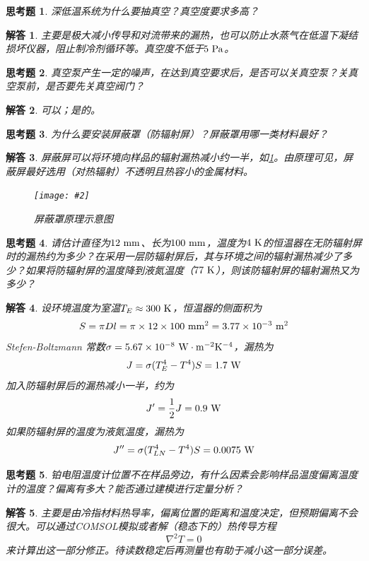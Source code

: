 \documentclass[11pt,a4paper]{ctexart}
\newcommand{\cpic}[2]{
\begin{center}
\texttt{[image: \#2]}
\end{center}
}
\newcommand{\cpicn}[3]
{
\begin{figure}[H]
\cpic{#1}{#2}
\caption{#3\label{#2}}
\end{figure}
}
\newcommand{\beq}{\begin{equation}}
\newcommand{\eeq}{\end{equation}}
\newcommand{\unit}[1]{\rm \ #1}
\newtheorem{que}{思考题}[section]
\newtheorem{ans}{解答}[section]
\begin{document}
\begin{que}
深低温系统为什么要抽真空？真空度要求多高？
\end{que}
\begin{ans}
主要是极大减小传导和对流带来的漏热，也可以防止水蒸气在低温下凝结损坏仪器，阻止制冷剂循环等。真空度不低于$5\unit{Pa}$。
\end{ans}
\begin{que}
真空泵产生一定的噪声，在达到真空要求后，是否可以关真空泵？关真空泵前，是否要先关真空阀门？
\end{que}
\begin{ans}
可以；是的。
\end{ans}
\begin{que}
为什么要安装屏蔽罩（防辐射屏）？屏蔽罩用哪一类材料最好？
\end{que}
\begin{ans}
屏蔽屏可以将环境向样品的辐射漏热减小约一半，如\cref{rad_red}。由原理可见，屏蔽屏最好选用（对热辐射）不透明且热容小的金属材料。
\cpicn{0.1}{rad_red}{屏蔽罩原理示意图}
\end{ans}
\begin{que}
请估计直径为$12\unit{mm}$、长为$100\unit{mm}$，温度为$4\unit{K}$的恒温器在无防辐射屏时的漏热约为多少？在采用一层防辐射屏后，其与环境之间的辐射漏热减少了多少？如果将防辐射屏的温度降到液氮温度（$77\unit{K}$），则该防辐射屏的辐射漏热又为多少？
\end{que}
\begin{ans}
设环境温度为室温$T_E \approx 300\unit{K}$，恒温器的侧面积为
\beq
S = \pi D l = \pi \times 12 \times 100 \unit{mm^2} = 3.77\times 10^{-3}\unit{m^2}
\eeq
Stefen-Boltzmann 常数$\sigma = 5.67\times 10^{-8} \unit{W \cdot m^{-2} K^{-4}}$\cite{them_phys,tdstat,stat1,dtsp}，漏热为
\beq
J = \sigma(T_E^4 - T^4) S = 1.7 \unit{W}
\eeq
加入防辐射屏后的漏热减小一半，约为
\beq
J' = \frac{1}{2} J = 0.9\unit{W}
\eeq
如果防辐射屏的温度为液氮温度，漏热为
\beq
J'' = \sigma(T_{LN}^4 - T^4) S = 0.0075 \unit{W}
\eeq
\end{ans}
\begin{que}
铂电阻温度计位置不在样品旁边，有什么因素会影响样品温度偏离温度计的温度？偏离有多大？能否通过建模进行定量分析？
\end{que}
\begin{ans}
主要是由冷指材料热导率，偏离位置的距离和温度决定，但预期偏离不会很大。可以通过COMSOL模拟或者解（稳态下的）热传导方程
\beq
\nabla^2 T = 0
\eeq
来计算出这一部分修正。待读数稳定后再测量也有助于减小这一部分误差。
\end{ans}
\end{document}
